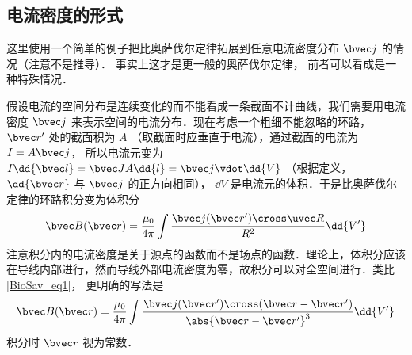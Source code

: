\subsection{电流密度的形式}
这里使用一个简单的例子把比奥萨伐尔定律拓展到任意电流密度分布 $\bvec j$ 的情况（注意不是推导）． 事实上这才是更一般的奥萨伐尔定律， 前者可以看成是一种特殊情况．

假设电流的空间分布是连续变化的而不能看成一条截面不计曲线，我们需要用电流密度 $\bvec j$ 来表示空间的电流分布．现在考虑一个粗细不能忽略的环路， $\bvec r'$ 处的截面积为 $A$ （取截面时应垂直于电流），通过截面的电流为 $I = A\bvec j$， 所以电流元变为 $I \dd{\bvec l} = \bvec JA \dd{l} = \bvec j \vdot \dd{V}$ （根据定义， $\dd{\bvec r}$ 与 $\bvec j$ 的正方向相同）， $\dd{V}$ 是电流元的体积．于是比奥萨伐尔定律的环路积分变为体积分
\begin{equation}
\bvec B(\bvec r) = \frac{\mu_0}{4\pi} \int \frac{\bvec j(\bvec r') \cross \uvec R}{R^2}\dd{V'}
\end{equation}
注意积分内的电流密度是关于源点的函数而不是场点的函数．理论上，体积分应该在导线内部进行，然而导线外部电流密度为零，故积分可以对全空间进行．类比\autoref{BioSav_eq1}， 更明确的写法是
\begin{equation}
\bvec B(\bvec r) = \frac{\mu_0}{4\pi} \int \frac{\bvec j(\bvec r') \cross (\bvec r - \bvec r')}{\abs{\bvec r - \bvec r'}^3} \dd{V'}
\end{equation}
积分时 $\bvec r$ 视为常数．
